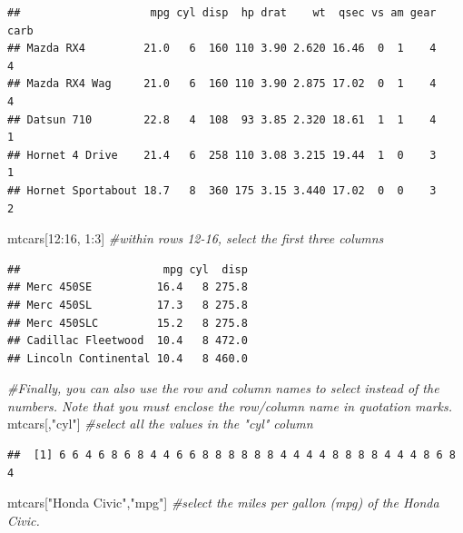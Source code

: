 \documentclass[
]{book}
\newenvironment{Shaded}{\begin{snugshade}}{\end{snugshade}}
\newcommand{\CommentTok}[1]{\textcolor[rgb]{0.56,0.35,0.01}{\textit{#1}}}
\newcommand{\DecValTok}[1]{\textcolor[rgb]{0.00,0.00,0.81}{#1}}
\newcommand{\NormalTok}[1]{#1}
\newcommand{\SpecialCharTok}[1]{\textcolor[rgb]{0.00,0.00,0.00}{#1}}
\newcommand{\StringTok}[1]{\textcolor[rgb]{0.31,0.60,0.02}{#1}}
\begin{document}
\begin{verbatim}
##                    mpg cyl disp  hp drat    wt  qsec vs am gear carb
## Mazda RX4         21.0   6  160 110 3.90 2.620 16.46  0  1    4    4
## Mazda RX4 Wag     21.0   6  160 110 3.90 2.875 17.02  0  1    4    4
## Datsun 710        22.8   4  108  93 3.85 2.320 18.61  1  1    4    1
## Hornet 4 Drive    21.4   6  258 110 3.08 3.215 19.44  1  0    3    1
## Hornet Sportabout 18.7   8  360 175 3.15 3.440 17.02  0  0    3    2
\end{verbatim}

\begin{Shaded}
\begin{Highlighting}[]
\NormalTok{mtcars[}\DecValTok{12}\SpecialCharTok{:}\DecValTok{16}\NormalTok{, }\DecValTok{1}\SpecialCharTok{:}\DecValTok{3}\NormalTok{] }\CommentTok{\#within rows 12{-}16, select the first three columns}
\end{Highlighting}
\end{Shaded}

\begin{verbatim}
##                      mpg cyl  disp
## Merc 450SE          16.4   8 275.8
## Merc 450SL          17.3   8 275.8
## Merc 450SLC         15.2   8 275.8
## Cadillac Fleetwood  10.4   8 472.0
## Lincoln Continental 10.4   8 460.0
\end{verbatim}

\begin{Shaded}
\begin{Highlighting}[]
\CommentTok{\#Finally, you can also use the row and column names to select instead of the numbers. Note that you must enclose the row/column name in quotation marks.}
\NormalTok{mtcars[,}\StringTok{"cyl"}\NormalTok{] }\CommentTok{\#select all the values in the "cyl" column}
\end{Highlighting}
\end{Shaded}

\begin{verbatim}
##  [1] 6 6 4 6 8 6 8 4 4 6 6 8 8 8 8 8 8 4 4 4 4 8 8 8 8 4 4 4 8 6 8 4
\end{verbatim}

\begin{Shaded}
\begin{Highlighting}[]
\NormalTok{mtcars[}\StringTok{"Honda Civic"}\NormalTok{,}\StringTok{"mpg"}\NormalTok{] }\CommentTok{\#select the miles per gallon (mpg) of the Honda Civic.}
\end{Highlighting}
\end{Shaded}
\end{document}
